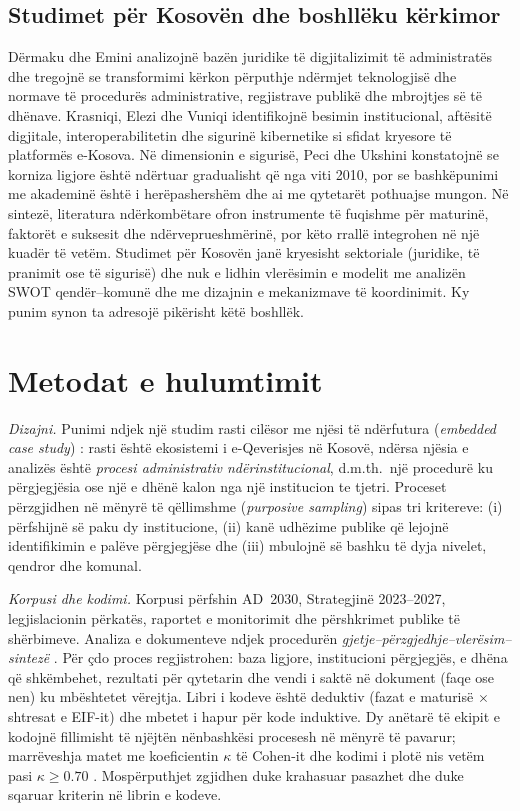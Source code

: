 \documentclass[conference]{IEEEtran}
\begin{document}
\subsection{Studimet për Kosovën dhe boshllëku kërkimor}
Dërmaku dhe Emini \cite{dermaku2024} analizojnë bazën juridike të
digjitalizimit të administratës dhe tregojnë se transformimi kërkon
përputhje ndërmjet teknologjisë dhe normave të procedurës administrative,
regjistrave publikë dhe mbrojtjes së të dhënave. Krasniqi, Elezi dhe Vuniqi
\cite{krasniqi2026} identifikojnë besimin institucional, aftësitë digjitale,
interoperabilitetin dhe sigurinë kibernetike si sfidat kryesore të
platformës e-Kosova. Në dimensionin e sigurisë, Peci dhe Ukshini
\cite{kipred2022} konstatojnë se korniza ligjore është ndërtuar gradualisht
që nga viti 2010, por se bashkëpunimi me akademinë është i herëpashershëm
dhe ai me qytetarët pothuajse mungon. Në sintezë, literatura ndërkombëtare ofron instrumente
të fuqishme për maturinë, faktorët e suksesit dhe ndërveprueshmërinë, por
këto rrallë integrohen në një kuadër të vetëm. Studimet për Kosovën janë
kryesisht sektoriale (juridike, të pranimit ose të sigurisë) dhe nuk e lidhin
vlerësimin e modelit me analizën SWOT qendër--komunë dhe me dizajnin e
mekanizmave të koordinimit. Ky punim synon ta adresojë pikërisht këtë
boshllëk.
\section{Metodat e hulumtimit}
\label{sec:metodat}
\textit{Dizajni.} Punimi ndjek një studim rasti cilësor me njësi të
ndërfutura (\textit{embedded case study}) \cite{yin2018}: rasti është
ekosistemi i e-Qeverisjes në Kosovë, ndërsa njësia e analizës është
\textit{procesi administrativ ndërinstitucional}, d.m.th.\ një procedurë ku
përgjegjësia ose një e dhënë kalon nga një institucion te tjetri. Proceset
përzgjidhen në mënyrë të qëllimshme (\textit{purposive sampling}) sipas tri
kritereve: (i) përfshijnë së paku dy institucione, (ii) kanë udhëzime
publike që lejojnë identifikimin e palëve përgjegjëse dhe (iii) mbulojnë
së bashku të dyja nivelet, qendror dhe komunal.

\textit{Korpusi dhe kodimi.} Korpusi përfshin AD~2030, Strategjinë
2023--2027, legjislacionin përkatës, raportet e monitorimit dhe përshkrimet
publike të shërbimeve. Analiza e dokumenteve ndjek procedurën
\textit{gjetje--përzgjedhje--vlerësim--sintezë} \cite{bowen2009}. Për çdo
proces regjistrohen: baza ligjore, institucioni përgjegjës, e dhëna që
shkëmbehet, rezultati për qytetarin dhe vendi i saktë në dokument (faqe ose
nen) ku mbështetet vërejtja. Libri i kodeve është deduktiv (fazat e maturisë
$\times$ shtresat e EIF-it) dhe mbetet i hapur për kode induktive. Dy
anëtarë të ekipit e kodojnë fillimisht të njëjtën nënbashkësi procesesh në
mënyrë të pavarur; marrëveshja matet me koeficientin $\kappa$ të Cohen-it
dhe kodimi i plotë nis vetëm pasi $\kappa \geq 0.70$ \cite{mchugh2012}. Mospërputhjet
zgjidhen duke krahasuar pasazhet dhe duke sqaruar kriterin në librin e
kodeve.
\end{document}
